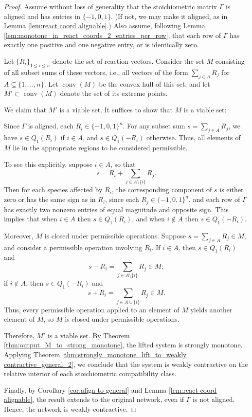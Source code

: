 \documentclass{article}
\begin{document}
\begin{proof}
Assume without loss of generality that the stoichiometric matrix \( \Gamma \) is aligned and has entries in \( \{-1, 0, 1\} \). (If not, we may make it aligned, as in Lemma \ref{lem:react coord alignable}.) Also assume, following Lemma \ref{lem:monotone_in_react_coords_2_entries_per_row}, that each row of \( \Gamma \) has exactly one positive and one negative entry, or is identically zero.

Let \( \{R_i\}_{1 \leq i \leq n} \) denote the set of reaction vectors. Consider the set \( M \) consisting of all subset sums of these vectors, i.e., all vectors of the form \( \sum_{j \in A} R_j \) for \( A \subseteq \{1, \dots, n\} \). Let \( \operatorname{conv}(M) \) be the convex hull of this set, and let \( M' \subset \operatorname{conv}(M) \) denote the set of its extreme points.

We claim that \( M' \) is a viable set. It suffices to show that \( M \) is a viable set:

Since \( \Gamma \) is aligned, each \( R_i \in \{-1, 0, 1\}^n \). For any subset sum \( s = \sum_{j \in A} R_j \), we have \( s \in Q_1(R_i) \) if \( i \in A \), and \( s \in Q_1(-R_i) \) otherwise. Thus, all elements of \( M \) lie in the appropriate regions to be considered permissible.

To see this explicitly, suppose \( i \in A \), so that
\[
s = R_i + \sum_{j \in A \setminus \{i\}} R_j.
\]
Then for each species affected by \( R_i \), the corresponding component of \( s \) is either zero or has the same sign as in \( R_i \), since each \( R_j \in \{-1, 0, 1\}^n \), and each row of \( \Gamma \) has exactly two nonzero entries of equal magnitude and opposite sign. This implies that when $i \in A$ then $s \in Q_1(R_i)$, and when $i \not\in A$ then $s \in Q_1(-R_i)$.

Moreover, \( M \) is closed under permissible operations. Suppose \( s = \sum_{j \in A} R_j \in M \), and consider a permissible operation involving \( R_i \). If \( i \in A \), then $s \in Q_1(R_i)$ and
\[
s - R_i = \sum_{j \in A \setminus \{i\}} R_j \in M;
\]
if \( i \notin A \), then $s \in Q_1(-R_i)$ and
\[
s + R_i = \sum_{j \in A \cup \{i\}} R_j \in M.
\]
Thus, every permissible operation applied to an element of \( M \) yields another element of \( M \), so \( M \) is closed under permissible operations.

Therefore, \( M' \) is a viable set. By Theorem \ref{thm:output_M_to_strong_monotone}, the lifted system is strongly monotone. Applying Theorem \ref{thm:strongly_monotone_lift_to_weakly contractive_general_2}, we conclude that the system is weakly contractive on the relative interior of each stoichiometric compatibility class.

Finally, by Corollary \ref{cor:align to general} and Lemma \ref{lem:react coord alignable}, the result extends to the original network, even if \( \Gamma \) is not aligned. Hence, the network is weakly contractive.
\end{proof}
\end{document}
